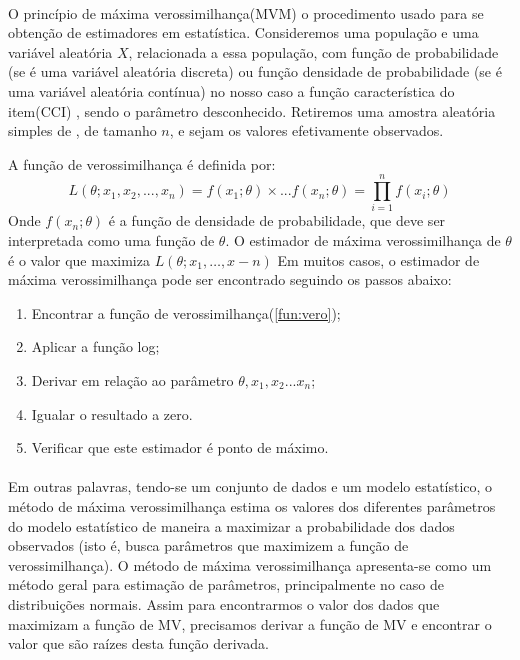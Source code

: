 	\paragraph{}
	    O princípio de máxima verossimilhança(MVM) o procedimento usado para se obtenção de estimadores em estatística. Consideremos uma população e uma variável aleatória $X$, relacionada a essa população, com função de probabilidade (se é uma variável aleatória discreta) ou função densidade de probabilidade (se  é uma variável aleatória contínua) no nosso caso a função característica do item(CCI) , sendo  o parâmetro desconhecido. Retiremos uma amostra aleatória simples de , de tamanho $n$, e sejam  os valores efetivamente observados.\par
	    A função de verossimilhança  é definida por:
	\begin{equation}
	    L(\theta; x_1,x_2,...,x_n) = f(x_1;\theta) \times ... f(x_n;\theta) = \prod_{i = 1}^{n} f(x_i;\theta)
	    \label{fun:vero}
	\end{equation}
	    Onde $f(x_n;\theta)$ é a função de densidade de probabilidade, que deve ser interpretada como uma função de $ \theta $. O estimador de máxima verossimilhança de $ \theta $ é o valor que maximiza $ L(\theta;x_1,\ldots,x-n) $
	    Em muitos casos, o estimador de máxima verossimilhança pode ser encontrado seguindo os passos abaixo:\\
    \begin{enumerate}
        \item Encontrar a função de verossimilhança(\ref{fun:vero});
        \item Aplicar a função log;
        \item Derivar em relação ao parâmetro $ \theta , x_1,x_2...x_n$;
        \item Igualar o resultado a zero.
        \item Verificar que este estimador é ponto de máximo.
    \end{enumerate}
    \paragraph{}
	    Em outras palavras, tendo-se um conjunto de dados e um modelo estatístico, o método de máxima verossimilhança estima os valores dos diferentes parâmetros do modelo estatístico de maneira a maximizar a probabilidade dos dados observados (isto é, busca parâmetros que maximizem a função de verossimilhança). O método de máxima verossimilhança apresenta-se como um método geral para estimação de parâmetros, principalmente no caso de distribuições normais. Assim para encontrarmos o valor dos dados que maximizam a função de MV, precisamos derivar a função de MV e encontrar o valor que são raízes desta função derivada.
